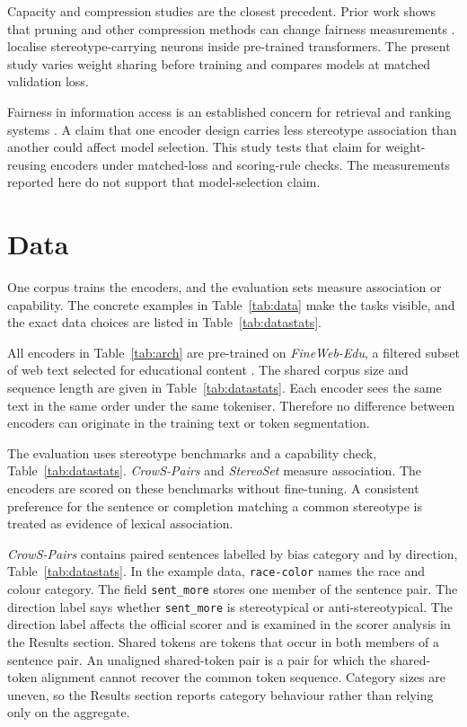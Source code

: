 \documentclass[sigconf,natbib=true,anonymous=true]{acmart}
\begin{document}
Capacity and compression studies are the closest precedent. Prior work shows
that pruning and other compression methods can change fairness measurements
\citep{hooker2020characterising,xu2022compression,ramesh2023comparative}.
\citet{voria2026tracing} localise stereotype-carrying neurons inside
pre-trained transformers. The present study varies weight sharing before
training and compares models at matched validation loss.

Fairness in information access is an established concern for retrieval and
ranking systems \citep{ekstrand2022fairness,singh2018fairness}. A claim that
one encoder design carries less stereotype association than another could affect
model selection. This study tests that claim for weight-reusing encoders under
matched-loss and scoring-rule checks. The measurements reported here do not
support that model-selection claim.

\section{Data}
\label{sec:data}

One corpus trains the encoders, and the evaluation sets measure association or
capability. The concrete examples in Table~\ref{tab:data} make the tasks
visible, and the exact data choices are listed in Table~\ref{tab:datastats}.

All encoders in Table~\ref{tab:arch} are pre-trained on \emph{FineWeb-Edu}, a
filtered subset of web text selected for educational content
\citep{penedo2024fineweb}. The shared corpus size and sequence length are given
in Table~\ref{tab:datastats}. Each encoder sees the same text in the same order
under the same tokeniser. Therefore no difference between encoders can originate
in the training text or token segmentation.

The evaluation uses stereotype benchmarks and a capability check,
Table~\ref{tab:datastats}. \emph{CrowS-Pairs} and \emph{StereoSet} measure
association. The encoders are scored on these benchmarks without fine-tuning. A
consistent preference for the sentence or completion matching a common
stereotype is treated as evidence of lexical association.

\emph{CrowS-Pairs} contains paired sentences labelled by bias category and by
direction, Table~\ref{tab:datastats}. In the example data, \texttt{race-color}
names the race and colour category. The field \texttt{sent\_more} stores one
member of the sentence pair. The direction label says whether
\texttt{sent\_more} is stereotypical or anti-stereotypical. The direction label
affects the official scorer and is examined in the scorer analysis in the
Results section. Shared tokens are tokens that occur in both members of a
sentence pair. An unaligned shared-token pair is a pair for which the
shared-token alignment cannot recover the common token sequence. Category sizes
are uneven, so the Results section reports category behaviour rather than
relying only on the aggregate.
\end{document}
